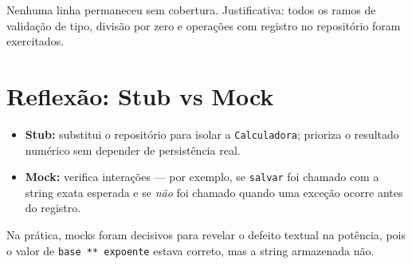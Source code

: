 \documentclass[11pt,a4paper]{article}
\begin{document}
Nenhuma linha permaneceu sem cobertura. Justificativa: todos os ramos de validação de tipo, divisão por zero e operações com registro no repositório foram exercitados.

\section{Reflexão: Stub vs Mock}
\begin{itemize}
    \item \textbf{Stub:} substitui o repositório para isolar a \texttt{Calculadora}; prioriza o resultado numérico sem depender de persistência real.
    \item \textbf{Mock:} verifica interações --- por exemplo, se \texttt{salvar} foi chamado com a string exata esperada e se \emph{não} foi chamado quando uma exceção ocorre antes do registro.
\end{itemize}
Na prática, mocks foram decisivos para revelar o defeito textual na potência, pois o valor de \texttt{base ** expoente} estava correto, mas a string armazenada não.
\end{document}
